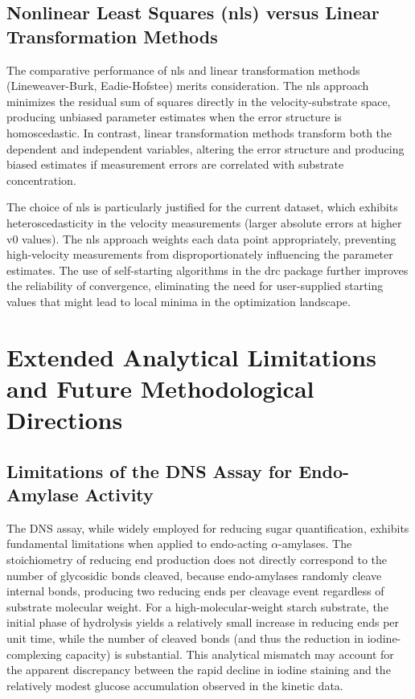 \documentclass[
  12pt,
]{article}
\begin{document}
\subsection{Nonlinear Least Squares (nls) versus Linear Transformation
Methods}\label{nonlinear-least-squares-nls-versus-linear-transformation-methods}

The comparative performance of nls and linear transformation methods
(Lineweaver-Burk, Eadie-Hofstee) merits consideration. The nls approach
minimizes the residual sum of squares directly in the velocity-substrate
space, producing unbiased parameter estimates when the error structure
is homoscedastic. In contrast, linear transformation methods transform
both the dependent and independent variables, altering the error
structure and producing biased estimates if measurement errors are
correlated with substrate concentration.

The choice of nls is particularly justified for the current dataset,
which exhibits heteroscedasticity in the velocity measurements (larger
absolute errors at higher v0 values). The nls approach weights each data
point appropriately, preventing high-velocity measurements from
disproportionately influencing the parameter estimates. The use of
self-starting algorithms in the drc package further improves the
reliability of convergence, eliminating the need for user-supplied
starting values that might lead to local minima in the optimization
landscape.

\section{Extended Analytical Limitations and Future Methodological
Directions}\label{extended-analytical-limitations-and-future-methodological-directions}

\subsection{Limitations of the DNS Assay for Endo-Amylase
Activity}\label{limitations-of-the-dns-assay-for-endo-amylase-activity}

The DNS assay, while widely employed for reducing sugar quantification,
exhibits fundamental limitations when applied to endo-acting
\(\alpha\)-amylases. The stoichiometry of reducing end production does
not directly correspond to the number of glycosidic bonds cleaved,
because endo-amylases randomly cleave internal bonds, producing two
reducing ends per cleavage event regardless of substrate molecular
weight. For a high-molecular-weight starch substrate, the initial phase
of hydrolysis yields a relatively small increase in reducing ends per
unit time, while the number of cleaved bonds (and thus the reduction in
iodine-complexing capacity) is substantial. This analytical mismatch may
account for the apparent discrepancy between the rapid decline in iodine
staining and the relatively modest glucose accumulation observed in the
kinetic data.
\end{document}
